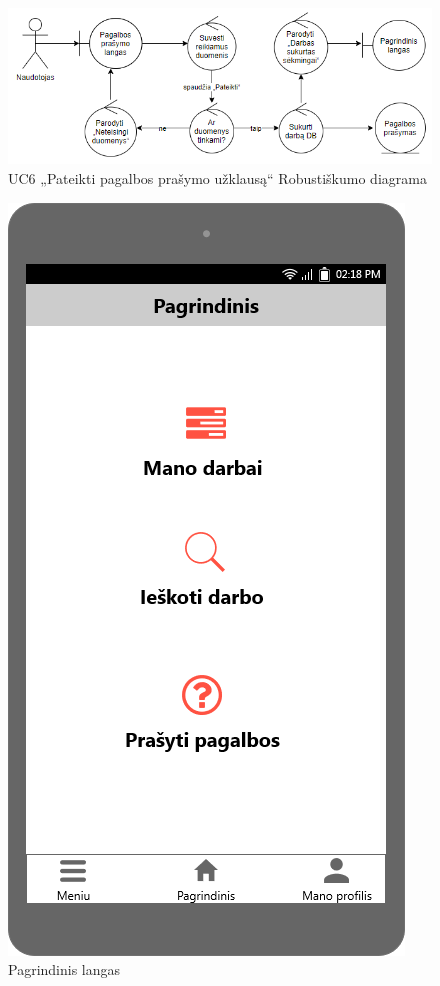 \documentclass{VUMIFPSbakalaurinis}
\begin{document}
\begin{figure}[H]
	\centering
	\includegraphics[scale=0.6]{img/Robustness/UC6}
	\caption{UC6 „Pateikti pagalbos prašymo užklausą“ Robustiškumo diagrama}
	\label{img:uc6rob}
\end{figure}

\begin{figure}[H]
	\centering
	\includegraphics[scale=0.4]{img/ScreenShots/12-Pagrindinis-langas}
	\caption{Pagrindinis langas}
	\label{img:main}
\end{figure}
\end{document}
